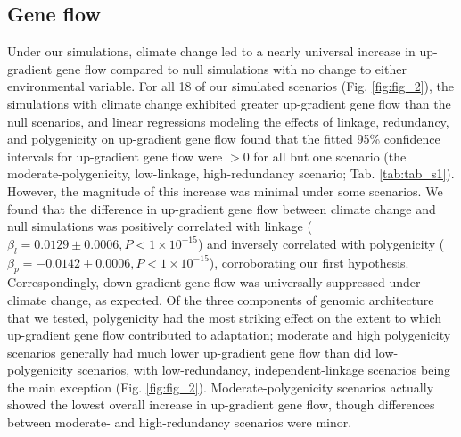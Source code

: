 \documentclass[9pt,twocolumn,twoside,lineno]{pnas-new}
\begin{document}
\subsection{Gene flow}
Under our simulations, climate change led to a nearly universal increase in up-gradient gene flow
compared to null simulations with no change to either environmental variable. For all 18 of our simulated scenarios (Fig. \ref{fig:fig_2}), the simulations with climate change exhibited greater up-gradient gene flow than the null scenarios, and linear regressions modeling the effects of linkage, redundancy, and polygenicity on up-gradient gene flow found that the 
fitted 95\% confidence intervals for up-gradient gene flow were $>0$ for all but
one scenario (the moderate-polygenicity, low-linkage, high-redundancy scenario; Tab. \ref{tab:tab_s1}).
However, the magnitude of this increase was minimal under
some scenarios. We found that the difference in up-gradient gene flow between climate change and null simulations was positively correlated with linkage
($\beta_{l} = 0.0129\pm0.0006, P<1\times10^{-15}$)
and inversely correlated with polygenicity
($\beta_{p} = -0.0142\pm0.0006, P<1\times10^{-15}$),
corroborating our first hypothesis.
Correspondingly, down-gradient gene flow was 
universally suppressed under climate change, as expected.
Of the three components of genomic architecture that we tested,
polygenicity had the most striking effect on the extent to which
up-gradient gene flow contributed to adaptation;
moderate and high polygenicity scenarios generally had much lower
up-gradient gene flow than did low-polygenicity scenarios,
with low-redundancy, independent-linkage scenarios being the main exception (Fig. \ref{fig:fig_2}).
Moderate-polygenicity scenarios actually showed the lowest overall increase
in up-gradient gene flow, though differences between moderate- and
high-redundancy scenarios were minor.
\end{document}
